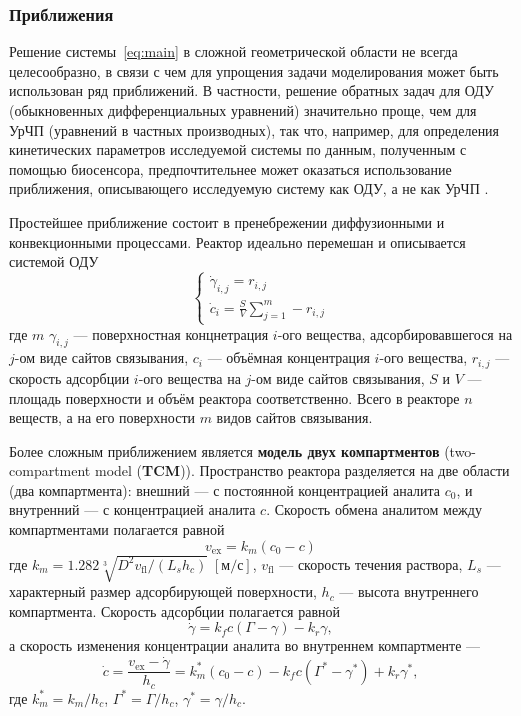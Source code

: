 \documentclass[oneside,final,12pt]{extreport}
\begin{document}
\subsubsection*{Приближения}
Решение системы~\eqref{eq:main} в сложной геометрической области
не всегда целесообразно,
в связи с чем для упрощения задачи моделирования
может быть использован ряд приближений.
В частности, решение обратных задач для ОДУ
(обыкновенных дифференциальных уравнений) значительно проще, чем для УрЧП
(уравнений в частных производных),
так что, например, для определения кинетических параметров исследуемой системы
по данным, полученным с помощью биосенсора, предпочтительнее
может оказаться использование
приближения, описывающего исследуемую систему как ОДУ, а не как УрЧП%
\cite{bib:FULLTEXT_inverse_example}.

Простейшее приближение состоит в пренебрежении диффузионными и конвекционными
процессами. Реактор идеально перемешан и описывается системой ОДУ
\begin{equation}
\begin{cases}
  \dot{\gamma}_{i,j} = r_{i,j}\\
  \dot{c}_i = \frac{S}{V}\sum\limits_{j=1}^{m}-r_{i,j}
\label{eq:perfectly_mixed_ode}
\end{cases}
\end{equation}
где $m$
$\gamma_{i,j}$ --- поверхностная концнетрация $i$-ого вещества,
адсорбировавшегося на $j$-ом виде сайтов связывания,
$c_i$ --- объёмная концентрация $i$-ого вещества,
$r_{i,j}$ --- скорость адсорбции $i$-ого вещества на $j$-ом виде сайтов связывания,
$S$ и $V$ --- площадь поверхности и объём реактора соответственно.
Всего в реакторе $n$ веществ, а на его поверхности $m$ видов сайтов связывания.

Более сложным приближением является \textbf{модель двух компартментов}
(two-compartment model (\textbf{TCM}))\cite{bib:TCM}.
Пространство реактора разделяется на две области (два компартмента):
внешний --- с постоянной концентрацией аналита $c_0$, и
внутренний --- с концентрацией аналита $c$.
Скорость обмена аналитом между компартментами полагается равной
\begin{equation}
  v_\text{ex} = k_m \left(c_0 - c\right)
\label{eq:TCM:exchange}
\end{equation}
где $k_m = 1.282\sqrt[3]{D^2 v_\text{fl} / \left(L_s h_c\right)}\;
  \left[\text{м}/\text{с}\right]$, 
$v_\text{fl}$ --- скорость течения раствора,
$L_s$ --- характерный размер адсорбирующей поверхности,
$h_c$ --- высота внутреннего компартмента.
Скорость адсорбции полагается равной
\begin{equation}
  \dot{\gamma} = k_f c \left(\Gamma - \gamma\right) - k_r\gamma,
\label{eq:TCM:adsorption}
\end{equation}
а скорость изменения концентрации аналита во внутреннем компартменте ---
\begin{equation}
  \dot{c} = \frac{v_\text{ex} - \dot{\gamma}}{h_c} =
            k_m^* \left(c_0 - c\right) - k_f c \left(\Gamma^* - \gamma^*\right) + k_r \gamma^*,
\label{eq:TCM:inner}
\end{equation}
где $k_m^* = k_m/h_c$, $\Gamma^* = \Gamma/h_c$, $\gamma^* = \gamma/h_c$.
\end{document}
